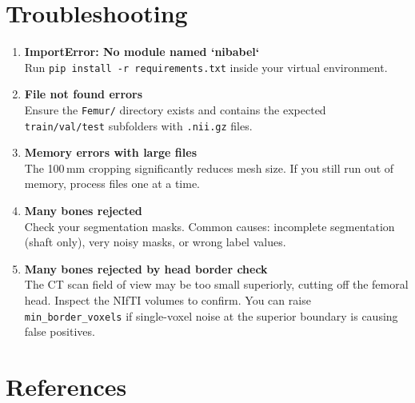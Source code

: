 \documentclass[12pt,a4paper]{article}
\begin{document}
\section{Troubleshooting}

\begin{enumerate}
    \item \textbf{ImportError: No module named `nibabel`}\\
          Run \texttt{pip install -r requirements.txt} inside your virtual
          environment.

    \item \textbf{File not found errors}\\
          Ensure the \texttt{Femur/} directory exists and contains the expected
          \texttt{train/val/test} subfolders with \texttt{.nii.gz} files.

    \item \textbf{Memory errors with large files}\\
          The 100\,mm cropping significantly reduces mesh size.
          If you still run out of memory, process files one at a time.

    \item \textbf{Many bones rejected}\\
          Check your segmentation masks.  Common causes: incomplete
          segmentation (shaft only), very noisy masks, or wrong label values.

    \item \textbf{Many bones rejected by head border check}\\
          The CT scan field of view may be too small superiorly, cutting off
          the femoral head.  Inspect the NIfTI volumes to confirm.  You can
          raise \texttt{min\_border\_voxels} if single-voxel noise at the
          superior boundary is causing false positives.
\end{enumerate}


\section{References}
\end{document}
